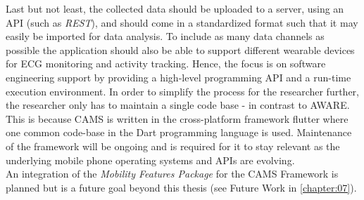 Last but not least, the collected data should be uploaded to a server, using an API (such as \textit{REST}), and should come in a standardized format such that it may easily be imported for data analysis. To include as many data channels as possible the application should also be able to support different wearable devices for ECG monitoring and activity tracking. Hence, the focus is on software engineering support by providing a high-level programming API and a run-time execution environment. In order to simplify the process for the researcher further, the researcher only has to maintain a single code base - in contrast to AWARE. This is because CAMS  is written in the cross-platform framework flutter where one common code-base in the Dart programming language is used. Maintenance of the framework will be ongoing and is required for it to stay relevant as the underlying mobile phone operating systems and APIs are evolving. \\

An integration of the \textit{Mobility Features Package} for the CAMS Framework is planned but is a future goal beyond this thesis (see Future Work in \ref{chapter:07}).